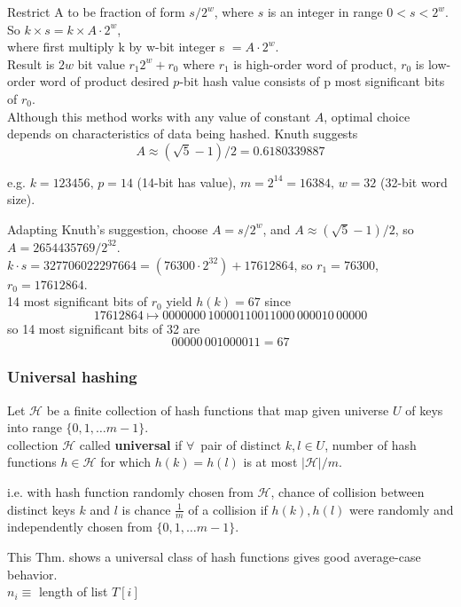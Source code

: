 \documentclass[10pt]{amsart}
\begin{document}
\begin{multicols*}{2}
Restrict A to be fraction of form $s/2^w$, where $s$ is an integer in range $0 < s < 2^w$.  \\

So $k \times s = k \times A \cdot 2^w$, \\
where first multiply k by w-bit integer s $= A \cdot 2^w$.  \\

Result is $2w$ bit value $r_1 2^w + r_0$ where $r_1$ is high-order word of product, $r_0$ is low-order word of product desired $p$-bit hash value consists of p most significant bits of $r_0$. \\

Although this method works with any value of constant $A$, optimal choice depends on characteristics of data being hashed. Knuth suggests
\[
A \approx (\sqrt{5} - 1) / 2 = 0.6180339887
\]

e.g. $k= 123456, \, p = 14$ (14-bit has value), $m = 2^{14} = 16384, \, w = 32$ (32-bit word size).

Adapting Knuth's suggestion, choose $A = s/2^w$, and $A \approx (\sqrt{5} - 1) / 2$, so $A = 2654435769 / 2^{32}$. \\
$ k \cdot s = 327706022297664 = (76300 \cdot 2^{32}) + 17612864$, so $r_1 = 76300$, $r_0 = 17612864$. \\
14 most significant bits of $r_0$ yield $h(k) = 67$ since 
\[
17612864 \mapsto 0000000 \, 10000110011000 \, 000010 \, 00000
\]
so 14 most significant bits of 32 are 
\[
00000 \, 00 1000011 = 67
\]

\subsubsection{Universal hashing}

Let $\mathcal{H}$ be a finite collection of hash functions that map given universe $U$ of keys into range $\lbrace 0 ,1 , \dots m -1 \rbrace$. \\
collection $\mathcal{H}$ called \textbf{universal} if $\forall \, $ pair of distinct $k, l \in U$, number of hash functions $h \in \mathcal{H}$ for which $h(k) = h(l)$ is at most $|\mathcal{H}| / m$.

i.e. with hash function randomly chosen from $\mathcal{H}$, chance of collision between distinct keys $k$ and $l$ is chance $\frac{1}{m}$ of a collision if $h(k), h(l)$ were randomly and independently chosen from $\lbrace 0, 1, \dots m -1 \rbrace$.

This Thm. shows a universal class of hash functions gives good average-case behavior. \\
$n_i \equiv $ length of list $T[i]$


\end{multicols*}
\end{document}
